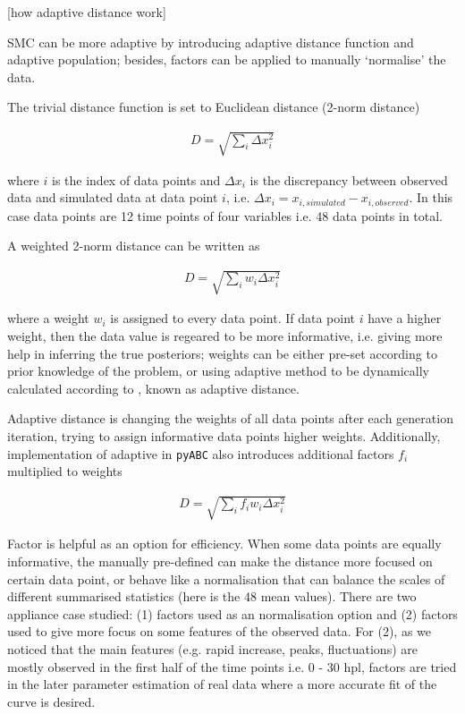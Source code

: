 \documentclass[12pt,a4paper]{report}
\begin{document}
[how adaptive distance work]

SMC can be more adaptive by introducing adaptive distance function and adaptive population; besides, factors can be applied to manually `normalise' the data.

The trivial distance function is set to Euclidean distance (2-norm distance)

\begin{align}
    \label{eq:dis}
    D=\sqrt{\sum_i \Delta x_i^2}
\end{align}

where $i$ is the index of data points and $\Delta x_i$ is the discrepancy between  observed data and simulated data at data point $i$, i.e. $\Delta x_i = x_{i, simulated}-x_{i, observed}$. In this case data points are 12 time points of four variables i.e. 48 data points in total.

A weighted 2-norm distance can be written as 

\begin{align}
    \label{dis_w}
    D=\sqrt{\sum_i w_i \Delta x_i^2}
\end{align}

where a weight $w_i$ is assigned to every data point. If data point $i$ have a higher weight, then the data value is regeared to be more informative, i.e. giving more help in inferring the true posteriors; weights can be either pre-set according to prior knowledge of the problem, or using adaptive method to be dynamically calculated according to , known as adaptive distance. 

Adaptive distance is changing the weights of all data points after each generation iteration, trying to assign informative data points higher weights. Additionally, implementation of adaptive in \verb|pyABC| also introduces additional factors $f_i$ multiplied to weights \cite{ref:adpt_dis} 

\begin{align}
    \label{dis_f}
    D=\sqrt{\sum_i f_iw_i \Delta x_i^2}
\end{align}

Factor is helpful as an option for efficiency. When some data points are equally informative, the manually pre-defined can make the distance more focused on certain data point, or behave like a normalisation that can balance the scales of different summarised statistics (here is the 48 mean values). There are two appliance case studied: (1) factors used as an normalisation option and (2) factors used to give more focus on some features of the observed data. For (2), as we noticed that the main features (e.g. rapid increase, peaks, fluctuations) are mostly observed in the first half of the time points i.e. 0 - 30 hpl, factors are tried in the later parameter estimation of real data where a more accurate fit of the curve is desired.
\end{document}
